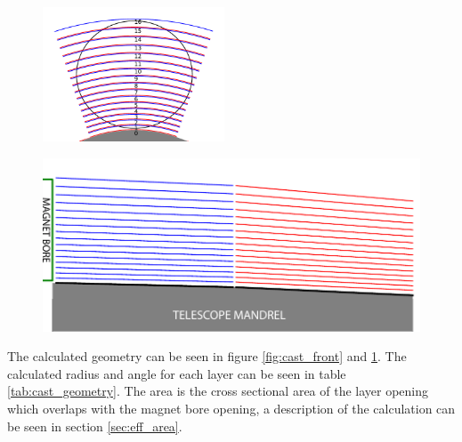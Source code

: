 \begin{figure}[htbp]
\centering
\begin{minipage}{.46\textwidth}
  \centering
  \includegraphics[height=4cm]{figures/cast/cast_front.pdf}
  \label{fig:cast_front}
\end{minipage}%
\hspace{20pt}
\begin{minipage}{.46\textwidth}
  \centering  \includegraphics[width=\linewidth]{figures/cast/cast_side.pdf}
  \label{fig:cast_side}
\end{minipage}
\end{figure}

The calculated geometry can be seen in figure \ref{fig:cast_front} and \ref{fig:cast_side}. The calculated radius and angle for each layer can be seen in table \ref{tab:cast_geometry}. The area is the cross sectional area of the layer opening which overlaps with the magnet bore opening, a description of the calculation can be seen in section \ref{sec:eff_area}.

